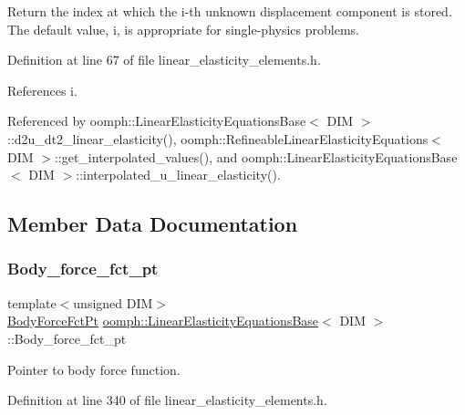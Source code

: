 Return the index at which the i-\/th unknown displacement component is stored. The default value, i, is appropriate for single-\/physics problems. 



Definition at line 67 of file linear\+\_\+elasticity\+\_\+elements.\+h.



References i.



Referenced by oomph\+::\+Linear\+Elasticity\+Equations\+Base$<$ D\+I\+M $>$\+::d2u\+\_\+dt2\+\_\+linear\+\_\+elasticity(), oomph\+::\+Refineable\+Linear\+Elasticity\+Equations$<$ D\+I\+M $>$\+::get\+\_\+interpolated\+\_\+values(), and oomph\+::\+Linear\+Elasticity\+Equations\+Base$<$ D\+I\+M $>$\+::interpolated\+\_\+u\+\_\+linear\+\_\+elasticity().



\subsection{Member Data Documentation}
\mbox{\label{classoomph_1_1LinearElasticityEquationsBase_a78c5d7f18c1c1661311ae1db92ab8f41}} 
\subsubsection{\texorpdfstring{Body\+\_\+force\+\_\+fct\+\_\+pt}{Body\_force\_fct\_pt}}
{\footnotesize\ttfamily template$<$unsigned D\+IM$>$ \\
\hyperlink{classoomph_1_1LinearElasticityEquationsBase_ada2fc7aa2569c35e28982f93a0749903}{Body\+Force\+Fct\+Pt} \hyperlink{classoomph_1_1LinearElasticityEquationsBase}{oomph\+::\+Linear\+Elasticity\+Equations\+Base}$<$ D\+IM $>$\+::Body\+\_\+force\+\_\+fct\+\_\+pt\hspace{0.3cm}{\ttfamily [protected]}}



Pointer to body force function. 



Definition at line 340 of file linear\+\_\+elasticity\+\_\+elements.\+h.



